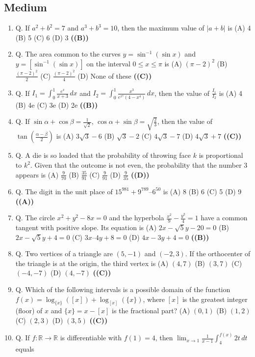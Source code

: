 \documentclass{article}
\begin{document}
\subsection{Medium}
\begin{enumerate}
\item Q. If $a^2 + b^2 = 7$ and $a^3 + b^3 = 10$, then the maximum value of $|a + b|$ is
(A) 4
(B) 5
(C) 6
(D) 3 \hfill \textbf{((B))}
\item Q. The area common to the curves $y = \sin^{-1}(\sin x)$ and $y = [\sin^{-1}(\sin x)]$ on the interval $0 \le x \le \pi$ is
(A) $(\pi - 2)^2$
(B) $\frac{(\pi-2)^2}{2}$
(C) $\frac{(\pi-2)^2}{4}$
(D) None of these \hfill \textbf{((C))}
\item Q. If $I_1 = \int_0^1 \frac{e^x}{x + 3}\,dx$ and $I_2 = \int_0^1 \frac{x^3}{e^{x^4}(4 - x^4)}\,dx$, then the value of $\frac{I_1}{I_2}$ is
(A) 4
(B) 4e
(C) 3e
(D) 2e \hfill \textbf{((B))}
\item Q. If $\sin \alpha + \cos \beta = \frac{1}{\sqrt{2}}$, $\cos \alpha + \sin \beta = \sqrt{\frac{2}{3}}$, then the value of $\tan(\frac{\alpha-\beta}{2})$ is
(A) $3\sqrt{3}-6$
(B) $\sqrt{3}-2$
(C) $4\sqrt{3}-7$
(D) $4\sqrt{3}+7$ \hfill \textbf{((C))}
\item Q. A die is so loaded that the probability of throwing face $k$ is proportional to $k^2$. Given that the outcome is not even, the probability that the number 3 appears is
(A) $\frac{9}{70}$
(B) $\frac{35}{91}$
(C) $\frac{9}{91}$
(D) $\frac{9}{35}$ \hfill \textbf{((D))}
\item Q. The digit in the unit place of $15^{981} + 9^{789} – 6^{50}$ is
(A) 8
(B) 6
(C) 5
(D) 9 \hfill \textbf{((A))}
\item Q. The circle $x^2 + y^2 - 8x = 0$ and the hyperbola $\frac{x^2}{9} - \frac{y^2}{4} = 1$ have a common tangent with positive slope. Its equation is
(A) $2x - \sqrt{5}y - 20 = 0$
(B) $2x - \sqrt{5}y + 4 = 0$
(C) $3x – 4y +8=0$
(D) $4x - 3y +4=0$ \hfill \textbf{((B))}
\item Q. Two vertices of a triangle are $(5, -1)$ and $(-2, 3)$. If the orthocenter of the triangle is at the origin, the third vertex is
(A) $(4,7)$
(B) $(3,7)$
(C) $(-4, -7)$
(D) $(4,-7)$ \hfill \textbf{((C))}
\item Q. Which of the following intervals is a possible domain of the function $f(x) = \log_{\{x\}}([x]) + \log_{[x]}(\{x\})$, where $[x]$ is the greatest integer (floor) of $x$ and $\{x\} = x - [x]$ is the fractional part?
(A) $(0,1)$
(B) $(1,2)$
(C) $(2,3)$
(D) $(3,5)$ \hfill \textbf{((C))}
\item Q. If $f: \mathbb{R} \to \mathbb{R}$ is differentiable with $f(1) = 4$, then $\lim_{x \to 1} \frac{1}{x-1} \int_4^{f(x)} 2t\,dt$ equals

\end{enumerate}
\end{document}
